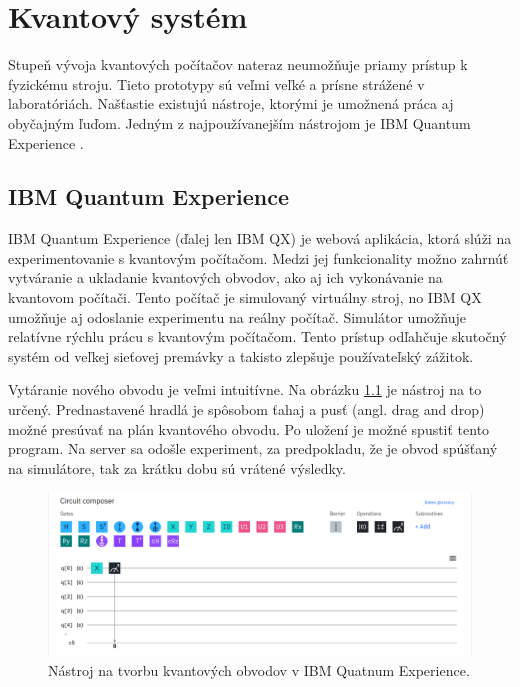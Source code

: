 
\chapter{Kvantový systém}

Stupeň vývoja kvantových počítačov nateraz neumožňuje priamy prístup k
fyzickému stroju. Tieto prototypy sú veľmi veľké a prísne strážené v 
laboratóriách. Našťastie existujú nástroje, ktorými je umožnená práca aj 
obyčajným ľuďom. Jedným z najpoužívanejším nástrojom je IBM Quantum Experience
\cite{IBM}. 

\section{IBM Quantum Experience}
IBM Quantum Experience (ďalej len IBM QX) je webová aplikácia, ktorá 
slúži na experimentovanie s kvantovým počítačom. Medzi jej funkcionality 
možno zahrnúť vytváranie a ukladanie kvantových obvodov, ako aj ich 
vykonávanie na kvantovom počítači. Tento počítač je simulovaný virtuálny 
stroj, no IBM QX umožňuje aj odoslanie experimentu na reálny počítač. 
Simulátor umožňuje relatívne rýchlu prácu s kvantovým počítačom. Tento
prístup odľahčuje skutočný systém od veľkej sieťovej premávky a takisto 
zlepšuje používateľský zážitok.

Vytáranie nového obvodu je veľmi intuitívne. Na obrázku \ref{ibm_qx_composer}
je nástroj na to určený. Prednastavené hradlá je spôsobom ťahaj a pusť (angl.
drag and drop) možné presúvať na plán kvantového obvodu. Po uložení je možné
spustiť tento program. Na server sa odošle experiment, za predpokladu, že
je obvod spúšťaný na simulátore, tak za krátku dobu sú vrátené výsledky.

\begin{figure} 
	\centering 
	\includegraphics[width=1\textwidth]{figures/ibm_qx_composer.png} 
	\caption{Nástroj na tvorbu kvantových obvodov v IBM Quatnum Experience.}
    \label{ibm_qx_composer}
\end{figure}

